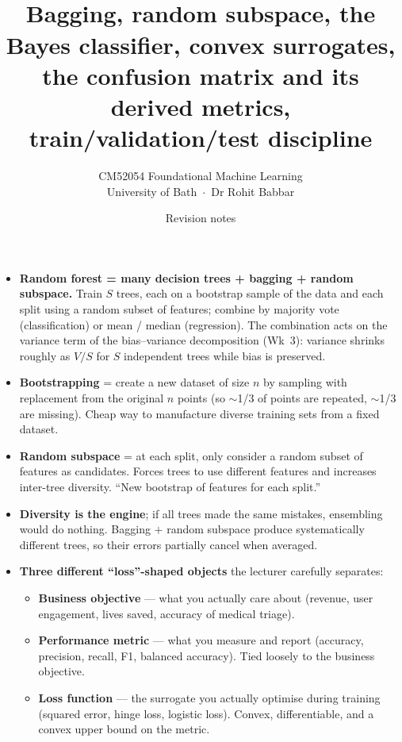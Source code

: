 \documentclass[11pt, a4paper]{article}
\title{\vspace{-1cm}{\Huge\bfseries Week 4 — Random Forests, Loss Functions \& Performance Measures} \\[0.4em]{\large Bagging, random subspace, the Bayes classifier, convex surrogates, the confusion matrix and its derived metrics, train/validation/test discipline}}
\author{\large CM52054 Foundational Machine Learning \\[0.2em]\normalsize University of Bath \,$\cdot$\, Dr Rohit Babbar}
\date{Revision notes}
\begin{document}
\maketitle
\thispagestyle{empty}

\vspace{1em}

\begin{tldrbox}
\begin{itemize}[leftmargin=*]
  \item \textbf{Random forest = many decision trees + bagging + random subspace.} Train $S$ trees, each on a bootstrap sample of the data and each split using a random subset of features; combine by majority vote (classification) or mean / median (regression). The combination acts on the variance term of the bias--variance decomposition (Wk~3): variance shrinks roughly as $V/S$ for $S$ independent trees while bias is preserved.
  \item \textbf{Bootstrapping} = create a new dataset of size $n$ by sampling with replacement from the original $n$ points (so $\sim$1/3 of points are repeated, $\sim$1/3 are missing). Cheap way to manufacture diverse training sets from a fixed dataset.
  \item \textbf{Random subspace} = at each split, only consider a random subset of features as candidates. Forces trees to use different features and increases inter-tree diversity. ``New bootstrap of features for each split.''
  \item \textbf{Diversity is the engine}; if all trees made the same mistakes, ensembling would do nothing. Bagging $+$ random subspace produce systematically different trees, so their errors partially cancel when averaged.
  \item \textbf{Three different ``loss''-shaped objects} the lecturer carefully separates:
  \begin{itemize}
    \item \textbf{Business objective} — what you actually care about (revenue, user engagement, lives saved, accuracy of medical triage).
    \item \textbf{Performance metric} — what you measure and report (accuracy, precision, recall, F1, balanced accuracy). Tied loosely to the business objective.
    \item \textbf{Loss function} — the surrogate you actually optimise during training (squared error, hinge loss, logistic loss). Convex, differentiable, and a convex upper bound on the metric.
  \end{itemize}

\end{itemize}
\end{tldrbox}
\end{document}
